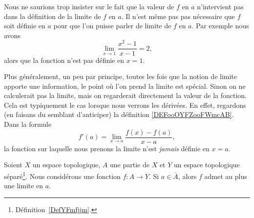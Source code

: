 \begin{remark}
    Nous ne saurions trop insister sur le fait que la valeur de \( f\) en \( a\) n'intervient pas dans la définition de la limite de \( f\) en \( a\). Il n'est même pas pas nécessaire que \( f\) soit définie en \( a\) pour que l'on puisse parler de limite de \( f\) en \( a\). Par exemple nous avons
    \begin{equation}
        \lim_{x\to 1} \frac{ x^2-1 }{ x-1 }=2,
    \end{equation}
    alors que la fonction n'est pas définie en \( x=1\).

    Plus généralement, un peu par principe, toutes les fois que la notion de limite apporte une information, le point où l'on prend la limite est spécial. Sinon on ne calculerait pas la limite, mais on regarderait directement la valeur de la fonction. Cela est typiquement le cas lorsque nous verrons les dérivées. En effet, regardons (en faisans du semblant d'anticiper) la définition  \eqref{DEFooOYFZooFWmcAB}. Dans la formule
    \begin{equation}
        f'(a)=\lim_{x\to a} \frac{ f(x)-f(a) }{ x-a },
    \end{equation}
    la fonction sur laquelle nous prenons la limite n'est \emph{jamais} définie en \( x=a\).
\end{remark}

\begin{proposition}\label{PropFObayrf}
    Soient \( X\) un espace topologique, \( A\) une partie de \( X\) et \( Y\) un espace topologique séparé\footnote{Définition~\ref{DefYFmfjjm}.}. Nous considérons une fonction \( f\colon A\to Y\). Si \( a\in\bar A\), alors \( f\) admet au plus une limite en \( a\).
\end{proposition}

